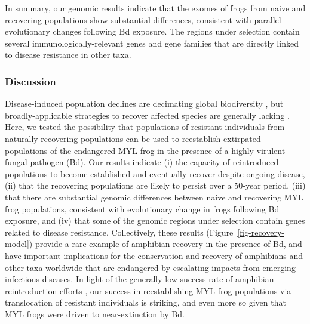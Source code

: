 \documentclass[
  letterpaper,
  DIV=11,
  numbers=noendperiod]{scrartcl}
\begin{document}
In summary, our genomic results indicate that the exomes of frogs from
naive and recovering populations show substantial differences,
consistent with parallel evolutionary changes following Bd exposure. The
regions under selection contain several immunologically-relevant genes
and gene families that are directly linked to disease resistance in
other taxa.

\hypertarget{discussion}{%
\subsubsection{Discussion}\label{discussion}}

Disease-induced population declines are decimating global biodiversity
\citep{daszak2000}, but broadly-applicable strategies to recover
affected species are generally lacking \citep[e.g.,][]{garner2016}.
Here, we tested the possibility that populations of resistant
individuals from naturally recovering populations can be used to
reestablish extirpated populations of the endangered MYL frog in the
presence of a highly virulent fungal pathogen (Bd). Our results indicate
(i) the capacity of reintroduced populations to become established and
eventually recover despite ongoing disease, (ii) that the recovering
populations are likely to persist over a 50-year period, (iii) that
there are substantial genomic differences between naive and recovering
MYL frog populations, consistent with evolutionary change in frogs
following Bd exposure, and (iv) that some of the genomic regions under
selection contain genes related to disease resistance. Collectively,
these results (Figure~\ref{fig-recovery-model}) provide a rare example
of amphibian recovery in the presence of Bd, and have important
implications for the conservation and recovery of amphibians and other
taxa worldwide that are endangered by escalating impacts from emerging
infectious diseases. In light of the generally low success rate of
amphibian reintroduction efforts \citep{dodd2005}, our success in
reestablishing MYL frog populations via translocation of resistant
individuals is striking, and even more so given that MYL frogs were
driven to near-extinction by Bd.
\end{document}
